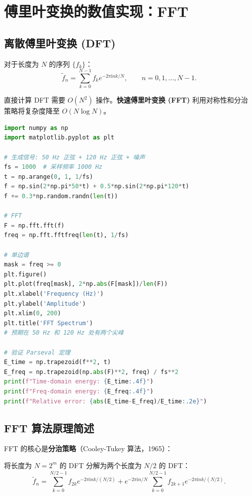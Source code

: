 \section{傅里叶变换的数值实现：FFT}
\label{sec:fft}

\subsection{离散傅里叶变换 (DFT)}

对于长度为 $N$ 的序列 $\{f_k\}$：
\begin{equation}
\tilde{f}_n = \sum_{k=0}^{N-1} f_k e^{-2\pi\mathrm{i} nk/N},\qquad
n=0,1,\dots,N-1.
\label{eq:dft}
\end{equation}

直接计算 DFT 需要 $O(N^2)$ 操作。\textbf{快速傅里叶变换 (FFT)} 利用对称性和分治策略将复杂度降至 $O(N\log N)$。

\begin{lstlisting}[language=Python, caption=FFT 频谱分析]
import numpy as np
import matplotlib.pyplot as plt

# 生成信号: 50 Hz 正弦 + 120 Hz 正弦 + 噪声
fs = 1000  # 采样频率 1000 Hz
t = np.arange(0, 1, 1/fs)
f = np.sin(2*np.pi*50*t) + 0.5*np.sin(2*np.pi*120*t)
f += 0.3*np.random.randn(len(t))

# FFT
F = np.fft.fft(f)
freq = np.fft.fftfreq(len(t), 1/fs)

# 单边谱
mask = freq >= 0
plt.figure()
plt.plot(freq[mask], 2*np.abs(F[mask])/len(F))
plt.xlabel('Frequency (Hz)')
plt.ylabel('Amplitude')
plt.xlim(0, 200)
plt.title('FFT Spectrum')
# 预期在 50 Hz 和 120 Hz 处有两个尖峰

# 验证 Parseval 定理
E_time = np.trapezoid(f**2, t)
E_freq = np.trapezoid(np.abs(F)**2, freq) / fs**2
print(f"Time-domain energy: {E_time:.4f}")
print(f"Freq-domain energy: {E_freq:.4f}")
print(f"Relative error: {abs(E_time-E_freq)/E_time:.2e}")
\end{lstlisting}

\subsection{FFT 算法原理简述}

FFT 的核心是\textbf{分治策略}（Cooley-Tukey 算法，1965）：

将长度为 $N=2^m$ 的 DFT 分解为两个长度为 $N/2$ 的 DFT：
\begin{equation}
\tilde{f}_n = \sum_{k=0}^{N/2-1} f_{2k} e^{-2\pi\mathrm{i} nk/(N/2)}
+ e^{-2\pi\mathrm{i} n/N}\sum_{k=0}^{N/2-1} f_{2k+1} e^{-2\pi\mathrm{i} nk/(N/2)}.
\end{equation}

